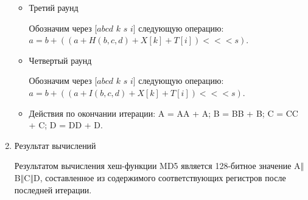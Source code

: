 \documentclass{./civarticle}
\begin{document}
\begin{enumerate}
\begin{itemize}
        \begin{figure}[h!]
        \end{figure}

        \item Третий раунд

        Обозначим через $[abcd$ $k$ $s$ $i]$ следующую операцию: $a = b + ((a + H(b,c,d) + X[k] + T[i]) <<< s)$.

        \begin{figure}[h!]
        \end{figure}

        \item Четвертый раунд

        Обозначим через $[abcd$ $k$ $s$ $i]$ следующую операцию: $a = b + ((a + I(b,c,d) + X[k] + T[i]) <<< s)$.

        \begin{figure}[h!]
        \end{figure}

        \item Действия по окончании итерации: A = AA + A; B = BB + B; C = CC + C; D = DD + D.
        
    \end{itemize}

    \item Результат вычислений

    Результатом вычисления хеш-функции MD5 является 128-битное значение A$\mathbin\Vert$B$\mathbin\Vert$C$\mathbin\Vert$D, составленное из содержимого соответствующих регистров после последней итерации.
    
\end{enumerate}
\end{document}
